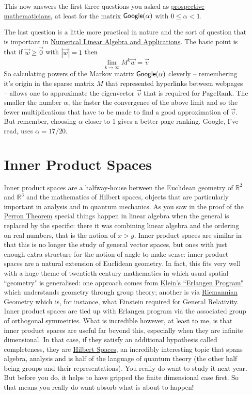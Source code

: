 \documentclass[11pt]{amsbook}
\theoremstyle{definition}
\begin{document}
This now answers the first three questions you asked as \hyperref[prospective]{prospective mathematicians}, at least for the matrix ${\sf Google}(\alpha)$ with $0\leqslant \alpha <1$.

The last question is a little more practical in nature and the sort of question that is important in \href{http://www.drps.ed.ac.uk/11-12/dpt/cxmath10059.htm}{Numerical Linear Algebra and Applications}. The basic point is that if $\vec{w} \geqslant \vec{0}$ with $|\vec{w}| =1$ then $$\lim_{k\to \infty}M^k \vec{w} = \vec{v}$$ So calculating powers of the Markov matrix ${\sf Google}(\alpha)$ cleverly -- remembering it's origin in the sparse matrix $M$ that represented hyperlinks between webpages -- allows one to approximate the eigenvector $\vec{v}$ that is required for PageRank. The smaller the number $\alpha$, the faster the convergence of the above limit and so the fewer multiplications that have to be made to find a good approximation of $\vec{v}$. But remember, choosing $\alpha$ closer to $1$ gives a better page ranking. Google, I've read, uses $\alpha = 17/20$.


\chapter{Inner Product Spaces}
Inner product spaces are a halfway-house between the Euclidean geometry of $\mathbb{R}^2$ and $\mathbb{R}^3$ and the mathematics of Hilbert spaces, objects that are particularly important in analysis and in quantum mechanics. As you saw in the proof of the \hyperref[perron]{Perron Theorem} special things happen in linear algebra when the general is replaced by the specific: there it was combining linear algebra and the ordering on real numbers, that is the notion of $x>y$. Inner product spaces are similar in that this is no longer the study of general vector spaces, but ones with just enough extra structure for the notion of angle to make sense: inner product spaces are a natural extension of Euclidean geometry. In fact, this fits very well with a huge theme of twentieth century mathematics in which usual spatial ``geometry" is generalised: one approach comes from \href{http://en.wikipedia.org/wiki/Erlangen_program}{Klein's ``Erlangen Program"} which understands geometry through group theory; another is via \href{http://en.wikipedia.org/wiki/Riemannian_geometry}{Riemannian Geometry} which is, for instance, what Einstein required for General Relativity. Inner product spaces are tied up with Erlangen program via the associated group of orthogonal symmetries. What is incredible however, at least to me, is that inner product spaces are useful far beyond this, especially when they are infinite dimensional. In that case, if they satisfy an additional hypothesis called completeness, they are \href{http://www.drps.ed.ac.uk/14-15/dpt/cxmath10046.htm}{Hilbert Spaces}, an incredibly interesting topic that spans algebra, analysis and is half of the language of quantum theory (the other half being groups and their representations). You really do want to study it next year. But before you do, it helps to have gripped the finite dimensional case first. So that means you really do want absorb what is about to happen!
\end{document}

